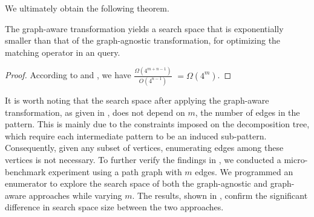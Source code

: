 We ultimately obtain the following theorem.

\begin{theorem}
    \label{thm:compare-search-space}
    The graph-aware transformation yields a search space that is exponentially smaller than that of the graph-agnostic transformation,
    for optimizing the matching operator in an \spjm query.
\end{theorem}
\begin{proof}
    According to  and , we have
        $\frac{\Omega(4^{m+n-1})}{O(4^{n-1})} $ $= \Omega(4^m)$.
\end{proof}

\enlargethispage{1em}

\begin{remark}
    \label{rem:search-space}
    It is worth noting that the search space after applying the graph-aware transformation, as given in , does not depend on $m$, the number of edges in the pattern. This is mainly due to the constraints imposed on the decomposition tree, which require each intermediate pattern to be an induced sub-pattern. Consequently, given any subset of vertices, enumerating edges among these vertices is not necessary. To further verify the findings in , we conducted a micro-benchmark experiment using a path graph with $m$ edges. We programmed an enumerator to explore the search space of both the graph-agnostic and graph-aware approaches while varying $m$. The results, shown in , confirm the significant difference in search space size between the two approaches.
\end{remark}





